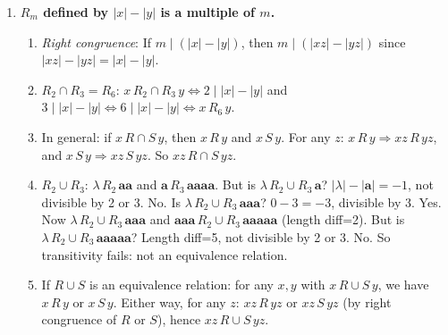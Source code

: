 \begin{enumerate}[{2.}1.]
$L_1=\{x\mid|x|_\mathbf{a}>|x|_\mathbf{b}\}$: Not FAD (Myhill-Nerode: strings $\mathbf{a}^n$ for each $n$ are in distinct classes).

$L_2=\{x\mid|x|_\mathbf{a}<3\}$: FAD (finite DFA with states tracking $\min(|x|_\mathbf{a},3)$).

$L_1\cap L_2$: $\{x\mid|x|_\mathbf{a}\in\{0,1,2\}\text{ and }|x|_\mathbf{a}>|x|_\mathbf{b}\}$. FAD (intersection of FAD with non-FAD can be FAD if the FAD constraint dominates -- here $L_2$ restricts to finitely many $|x|_\mathbf{a}$ values). FAD.

$\sim L_2=\{x\mid|x|_\mathbf{a}\geq 3\}$: FAD (complement of FAD is FAD).

$L_1\cup L_2$: Not FAD. If it were, then $L_1=(L_1\cup L_2)\cap\sim L_2$ would be FAD (intersection of two FAD), contradiction.

\item \textbf{$R_m$ defined by $|x|-|y|$ is a multiple of $m$.}

\begin{enumerate}
\item \textit{Right congruence}: If $m\mid(|x|-|y|)$, then $m\mid(|xz|-|yz|)$ since $|xz|-|yz|=|x|-|y|$.

\item $R_2\cap R_3 = R_6$: $x\,R_2\cap R_3\,y\Leftrightarrow 2\mid|x|-|y|$ and $3\mid|x|-|y|\Leftrightarrow 6\mid|x|-|y|\Leftrightarrow x\,R_6\,y$.

\item In general: if $x\,R\cap S\,y$, then $x\,R\,y$ and $x\,S\,y$. For any $z$: $x\,R\,y\Rightarrow xz\,R\,yz$, and $x\,S\,y\Rightarrow xz\,S\,yz$. So $xz\,R\cap S\,yz$.

\item $R_2\cup R_3$: $\lambda\,R_2\,\mathbf{aa}$ and $\mathbf{a}\,R_3\,\mathbf{aaaa}$. But is $\lambda\,R_2\cup R_3\,\mathbf{a}$? $|\lambda|-|\mathbf{a}|=-1$, not divisible by 2 or 3. No. Is $\lambda\,R_2\cup R_3\,\mathbf{aaa}$? $0-3=-3$, divisible by 3. Yes. Now $\lambda\,R_2\cup R_3\,\mathbf{aaa}$ and $\mathbf{aaa}\,R_2\cup R_3\,\mathbf{aaaaa}$ (length diff=2). But is $\lambda\,R_2\cup R_3\,\mathbf{aaaaa}$? Length diff=5, not divisible by 2 or 3. No. So transitivity fails: not an equivalence relation.

\item If $R\cup S$ is an equivalence relation: for any $x,y$ with $x\,R\cup S\,y$, we have $x\,R\,y$ or $x\,S\,y$. Either way, for any $z$: $xz\,R\,yz$ or $xz\,S\,yz$ (by right congruence of $R$ or $S$), hence $xz\,R\cup S\,yz$.
\end{enumerate}


\end{enumerate}
